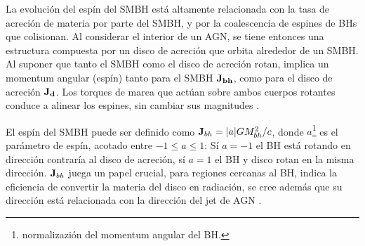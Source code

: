 La evolución del espín del SMBH está altamente relacionada con la tasa de acreción de materia por parte del SMBH\cite{king2005}, y por la coalescencia de espines de BHs que colisionan\cite{dubois2014}. Al considerar el interior de un AGN, se tiene entonces una estructura compuesta por un disco de acreción que orbita alrededor de un SMBH. Al suponer que tanto el SMBH como el disco de acreción rotan, implica un momentum angular (espín) tanto para el SMBH $\bf{J}_{bh}$, como para el disco de acreción $\bf{J}_{d}$. Los torques de marea que actúan sobre ambos cuerpos rotantes conduce a alinear los espines, sin cambiar sus magnitudes \cite{king2005}.

El espín del SMBH puede ser definido como ${\bf{J}}_{bh}=|a|GM^{2}_{bh}/c$, donde $a$\footnote{normalizazión del momentum angular del BH.} es el parámetro de espín, acotado entre $-1\leq a \leq 1$: Sí $a=-1$ el BH está rotando en dirección contraría al disco de acreción, sí $a=1$ el BH y disco rotan en la misma dirección. ${\bf{J}}_{bh}$ juega un papel crucial, para regiones cercanas al BH, indica la eficiencia de convertir la materia del disco en radiación, se cree además que su dirección está relacionada con la dirección del jet de AGN \cite{fanidakis2011}. 

